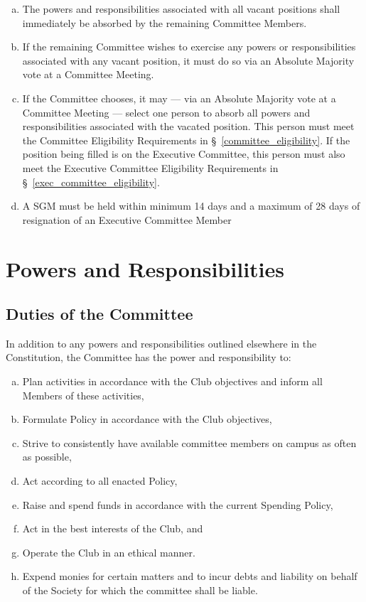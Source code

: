 \documentclass[a4paper,12pt]{article}
\begin{document}
\begin{enumerate}[a)]
	\item The powers and responsibilities associated with all vacant positions shall immediately be absorbed by the remaining Committee Members.
	\item If the remaining Committee wishes to exercise any powers or responsibilities associated with any vacant position, it must do so via an Absolute Majority vote at a Committee Meeting.
	\item If the Committee chooses, it may --- via an Absolute Majority vote at a Committee Meeting --- select one person to absorb all powers and responsibilities associated with the vacated position. This person must meet the Committee Eligibility Requirements in \S~\ref{committee_eligibility}. If the position being filled is on the Executive Committee, this person must also meet the Executive Committee Eligibility Requirements in \S~\ref{exec_committee_eligibility}.
	\item A SGM must be held within minimum 14 days and a maximum of 28 days of resignation of an Executive Committee Member
\end{enumerate}

\section{Powers and Responsibilities}

\subsection{Duties of the Committee}

In addition to any powers and responsibilities outlined elsewhere in the Constitution, the Committee has the power and responsibility to:

\begin{enumerate}[a)]
	\item Plan activities in accordance with the Club objectives and inform all Members of these activities,
	\item Formulate Policy in accordance with the Club objectives,
	\item Strive to consistently have available committee members on campus as often as possible,
	\item Act according to all enacted Policy,
	\item Raise and spend funds in accordance with the current Spending Policy,
	\item Act in the best interests of the Club, and
	\item Operate the Club in an ethical manner.
	\item Expend monies for certain matters and to incur debts and liability on behalf of the Society for which the committee shall be liable.
\end{enumerate}
\end{document}
